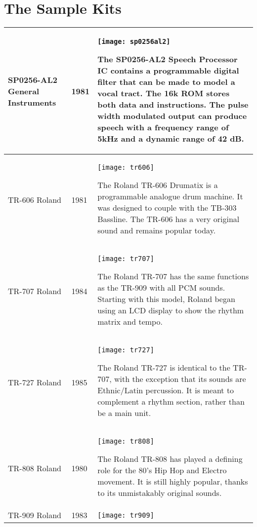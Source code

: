 \chapter{The Sample Kits}


\tablelasttail{ \hline }
\begin{xtabular}{p{2.02cm}|l|p{7.8cm}}

\hline
SP0256-AL2 \linebreak
General Instruments 
& 1981 & 
\texttt{[image: sp0256al2]}

The SP0256-AL2 Speech Processor IC contains a programmable digital filter that can be made to model a vocal tract. The 16k ROM stores both data and instructions. The pulse width modulated output can produce speech with a frequency range of 5kHz and a dynamic range of 42 dB. \\
\hline
TR-606 \linebreak Roland & 1981 & 
\texttt{[image: tr606]}

The Roland TR-606 Drumatix is a programmable analogue drum machine. It was designed to couple with the TB-303 Bassline. The TR-606 has a very original sound and remains popular today. \\
\hline
TR-707 \linebreak Roland & 1984 & 
\texttt{[image: tr707]}

The Roland TR-707 has the same functions as the TR-909 with all PCM sounds. Starting with this model, Roland began using an LCD display to show the rhythm matrix and tempo. \\
\hline
TR-727 \linebreak Roland & 1985 & 
\texttt{[image: tr727]}

The Roland TR-727 is identical to the TR-707, with the exception that its sounds are Ethnic/Latin percussion. It is meant to complement a rhythm section, rather than be a main unit. \\
\hline
TR-808 \linebreak Roland & 1980 & 
\texttt{[image: tr808]}

The Roland TR-808 has played a defining role for the 80's Hip Hop and Electro movement. It is still highly popular, thanks to its unmistakably original sounds. \\
\hline
TR-909 \linebreak Roland & 1983 & 
\texttt{[image: tr909]}


\end{xtabular}
